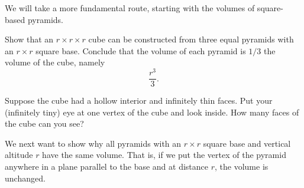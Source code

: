 \documentclass[hints,handout,noauthor,nooutcomes,12pt]{ximera}
\begin{document}
We will take a more fundamental route, starting with the volumes of square-based
pyramids.

\begin{problem}
  Show that an $r\times r\times r$ cube can be constructed from three
  equal pyramids with an $r\times r$ square base. Conclude that the
  volume of each pyramid is $1/3$ the volume of the cube, namely
  \[
  \frac{r^{3}}{3}.
  \]

\begin{hint}
  Suppose the cube had a hollow interior and infinitely thin
  faces. Put your (infinitely tiny) eye at one vertex of the cube and
  look inside. How many faces of the cube can you see?
\end{hint}

\begin{freeResponse}
\begin{image}
\end{image}
\end{freeResponse}
\end{problem}

We next want to show why all pyramids with an $r\times r$ square base
and vertical altitude $r$ have the same volume. That is, if we put the
vertex of the pyramid anywhere in a plane parallel to the base and at
distance $r$, the volume is unchanged.
\end{document}
